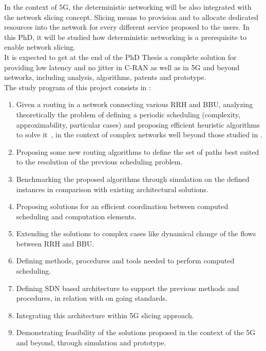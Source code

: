 \documentclass{article}
\begin{document}
In the context of 5G, the deterministic networking will be also integrated with the network slicing concept. Slicing means to provision and to allocate dedicated resources into the network for every different service proposed to the users.  In this PhD, it will be studied how deterministic networking is a prerequisite to enable network slicing.\\

It is expected to get at the end of the PhD Thesis a complete solution for providing low latency and no jitter  in C-RAN as well as in 5G and beyond networks, including analysis, algorithms, patents and prototype.\\

The study program of this project consists in :
 \begin{enumerate}
  \item Given a routing in a network connecting various RRH and BBU, analyzing theoretically the problem of defining a periodic scheduling (complexity, approximability, particular cases) and proposing efficient heuristic algorithms to solve it , in the context of complex networks well beyond those studied in \cite{rapportstage}.
\item  Proposing some new routing algorithms to define the set of paths  best suited to the resolution of  the previous scheduling problem.
\item  Benchmarking the proposed algorithms through simulation on the defined instances in comparison with existing architectural solutions.
\item  Proposing solutions for an efficient coordination between computed scheduling and computation elements.
\item  Extending the solutions to complex cases like dynamical change of the flows between RRH and BBU.
\item  Defining methods, procedures and tools needed to perform computed scheduling.
\item  Defining SDN based architecture to support the previous methods and procedures, in relation with on going standards.
\item  Integrating this architecture within 5G slicing approach.
\item  Demonstrating feasibility of the solutions proposed in the context of the 5G and beyond, through simulation and prototype. 
 \end{enumerate}


\end{document}

